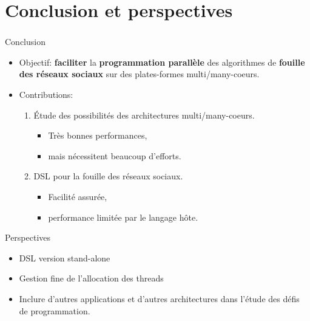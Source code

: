\documentclass[10pt]{beamer}
\begin{document}
\section{Conclusion et perspectives}
\begin{frame}%
\frametitle{}
\begin{block}{Conclusion}
\begin{itemize}
 \item Objectif: \textbf{faciliter} la \textbf{programmation parallèle} des algorithmes de \textbf{fouille des réseaux sociaux} sur des plates-formes multi/many-coeurs.
 \item Contributions:
 \begin{enumerate}
  \item Étude des possibilités des architectures multi/many-coeurs.
	\begin{itemize}
              \item Très bonnes performances, 
              \item mais nécessitent beaucoup d'efforts.
        \end{itemize}
  \item DSL pour la fouille des réseaux sociaux.
	\begin{itemize}
              \item Facilité assurée,
              \item performance limitée par le langage hôte.
        \end{itemize}
 \end{enumerate}
\end{itemize} 
\end{block}

\begin{block}{Perspectives}
 \begin{itemize}
  \item DSL version stand-alone
  \item Gestion fine de l'allocation des threads
  \item Inclure d'autres applications et d'autres architectures dans l'étude des défis de programmation.
\end{itemize}
\end{block}

\end{frame}
\end{document}
